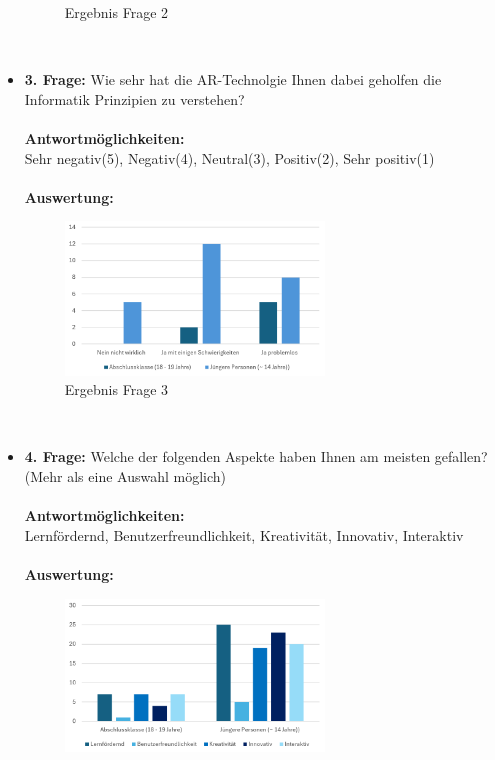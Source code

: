 \begin{itemize}
\begin{figure}[h]
        \caption{Ergebnis Frage 2}
        \label{fig:fr1}
    \end{figure}
    \\
    \item \textbf{3. Frage:} Wie sehr hat die AR-Technolgie Ihnen dabei geholfen die Informatik Prinzipien zu verstehen?
    \\
    \\
    \textbf{Antwortmöglichkeiten:}\\
    Sehr negativ(5), Negativ(4), Neutral(3), Positiv(2), Sehr positiv(1)
    \\
    \\
    \textbf{Auswertung:}
    \begin{figure}[h]
        \centering
        \includegraphics[width=0.65\textwidth]{images/AuswertungFrage2}
        \caption{Ergebnis Frage 3}
        \label{fig:fr1}
    \end{figure}
    \\
    \item \textbf{4. Frage:} Welche der folgenden Aspekte haben Ihnen am meisten gefallen? (Mehr als eine Auswahl möglich)
    \\
    \\
    \textbf{Antwortmöglichkeiten:}\\
    Lernfördernd, Benutzerfreundlichkeit, Kreativität, Innovativ, Interaktiv
    \\
    \\
    \textbf{Auswertung:}
    \begin{figure}[h]
        \centering
        \includegraphics[width=0.65\textwidth]{images/AuswertungFrage4}

\end{figure}
\end{itemize}
